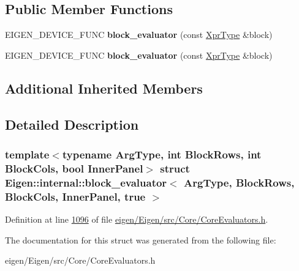 \subsection*{Public Member Functions}
\begin{DoxyCompactItemize}
\item 
\mbox{\label{struct_eigen_1_1internal_1_1block__evaluator_3_01_arg_type_00_01_block_rows_00_01_block_cols_00_01_inner_panel_00_01true_01_4_a69f3ec8b043f7e351e9382f2b8e938db}} 
E\+I\+G\+E\+N\+\_\+\+D\+E\+V\+I\+C\+E\+\_\+\+F\+U\+NC {\bfseries block\+\_\+evaluator} (const \hyperlink{group___core___module_class_eigen_1_1_block}{Xpr\+Type} \&block)
\item 
\mbox{\label{struct_eigen_1_1internal_1_1block__evaluator_3_01_arg_type_00_01_block_rows_00_01_block_cols_00_01_inner_panel_00_01true_01_4_a69f3ec8b043f7e351e9382f2b8e938db}} 
E\+I\+G\+E\+N\+\_\+\+D\+E\+V\+I\+C\+E\+\_\+\+F\+U\+NC {\bfseries block\+\_\+evaluator} (const \hyperlink{group___core___module_class_eigen_1_1_block}{Xpr\+Type} \&block)
\end{DoxyCompactItemize}
\subsection*{Additional Inherited Members}


\subsection{Detailed Description}
\subsubsection*{template$<$typename Arg\+Type, int Block\+Rows, int Block\+Cols, bool Inner\+Panel$>$\newline
struct Eigen\+::internal\+::block\+\_\+evaluator$<$ Arg\+Type, Block\+Rows, Block\+Cols, Inner\+Panel, true $>$}



Definition at line \hyperlink{eigen_2_eigen_2src_2_core_2_core_evaluators_8h_source_l01096}{1096} of file \hyperlink{eigen_2_eigen_2src_2_core_2_core_evaluators_8h_source}{eigen/\+Eigen/src/\+Core/\+Core\+Evaluators.\+h}.



The documentation for this struct was generated from the following file\+:\begin{DoxyCompactItemize}
\item 
eigen/\+Eigen/src/\+Core/\+Core\+Evaluators.\+h\end{DoxyCompactItemize}
